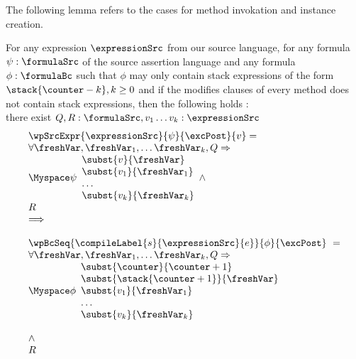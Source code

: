 The following lemma refers to the cases for method invokation and instance creation. 
\begin{exprSrcBcWp2} \label{pogEq:aux:exprSrcBcWp}
 For any expression $\expressionSrc$ from our source language, for any formula $\psi: \formulaSrc$  
of the source assertion language and any formula $\phi: \formulaBc$ such that $\phi$ may only 
contain stack expressions of the form     $\stack{\counter - k}, k \ge 0$ and if the modifies clauses of every
 method does not contain stack expressions, then the following holds : \\
there exist $ Q,R:\formulaSrc, v_1 \ldots v_k :\expressionSrc $
$$ \begin{array}{l} \wpSrcExpr{\expressionSrc }{ \psi }{ \excPost}{v} = \\
 \forall \freshVar, \freshVar_1, \ldots  \freshVar_k   ,  Q \Rightarrow \\
 \Myspace \psi 
                                                                             \begin{array}{l}
									         \subst{v }{ \freshVar }  \\
									        \subst{v_1 }{ \freshVar_1 }  \\
										\ldots \\
										\subst{v_k}{ \freshVar_k } 
									     \end{array}
          \wedge \\ 
	  R  

      
  \\
 \Longrightarrow \\
 \\

  
	    \wpBcSeq{ \compileLabel{s}{\expressionSrc}{e} }{ \phi }{\excPost} \  = \\ 
            \forall \freshVar, \freshVar_1, \ldots  \freshVar_k ,   Q \Rightarrow \\
	                      \Myspace \phi \begin{array}{l}
                                       \subst{\counter}{\counter + 1}\\
			               \subst{\stack{\counter +1}}{\freshVar  }\\
				       \subst{v_1 }{ \freshVar_1 }  \\
				       \ldots \\
				       \subst{v_k}{ \freshVar_k } 
                         \end{array} \\ \\
          \wedge \\ 
	  R 
  \end{array}$$
\end{exprSrcBcWp2}


